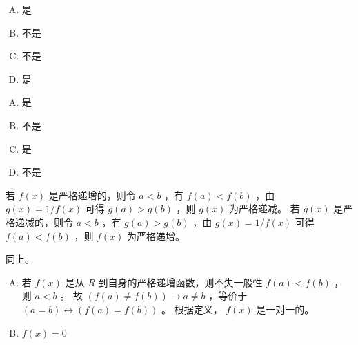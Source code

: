 {{        %
        \begin{practices}
            \begin{enumerate}[A.]
                \item 是
                \item 不是
                \item 不是
                \item 是
            \end{enumerate}
        \end{practices}

        \begin{practices}
            \begin{enumerate}[A.]
                \item 是
                \item 不是
                \item 是
                \item 不是
            \end{enumerate}
        \end{practices}

        \begin{practices}
            若 $f(x)$ 是严格递增的，则令 $a < b$ ，有 $f(a) < f(b)$ ，由 $g(x) = 1 / f(x)$ 可得 $g(a) > g(b)$ ，则 $g(x)$ 为严格递减。
            若 $g(x)$ 是严格递减的，则令 $a < b$ ，有 $g(a) > g(b)$ ，由 $g(x) = 1 / f(x)$ 可得 $f(a) < f(b)$ ，则 $f(x)$ 为严格递增。
        \end{practices}

        \begin{practices}
            同上。
        \end{practices}

        \begin{practices}
            \begin{enumerate}[A.]
                \item
                {
                    若 $f(x)$ 是从 $R$ 到自身的严格递增函数，则不失一般性 $f(a) < f(b)$ ，则 $a < b$ 。
                    故 $(f(a) \neq f(b)) \rightarrow a \neq b$ ，等价于 $(a = b) \leftrightarrow (f(a) = f(b))$ 。
                    根据定义， $f(x)$ 是一对一的。
                }
                \item
                {
                    $f(x) = 0$
                }
            \end{enumerate}
        \end{practices}

}}
